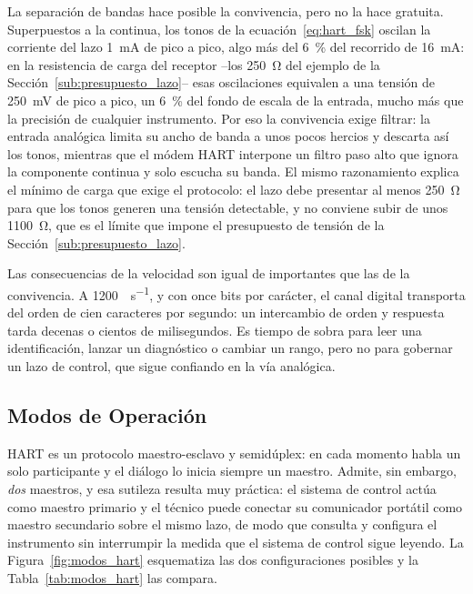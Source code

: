 La separación de bandas hace posible la convivencia, pero no la hace gratuita. Superpuestos a la continua, los tonos de la ecuación~\eqref{eq:hart_fsk} oscilan la corriente del lazo \SI{1}{\milli\ampere} de pico a pico, algo más del \SI{6}{\percent} del recorrido de \SI{16}{\milli\ampere}: en la resistencia de carga del receptor --los \SI{250}{\ohm} del ejemplo de la Sección~\ref{sub:presupuesto_lazo}-- esas oscilaciones equivalen a una tensión de \SI{250}{\milli\volt} de pico a pico, un \SI{6}{\percent} del fondo de escala de la entrada, mucho más que la precisión de cualquier instrumento. Por eso la convivencia exige filtrar: la entrada analógica limita su ancho de banda a unos pocos hercios y descarta así los tonos, mientras que el módem HART interpone un filtro paso alto que ignora la componente continua y solo escucha su banda. El mismo razonamiento explica el mínimo de carga que exige el protocolo: el lazo debe presentar al menos \SI{250}{\ohm} para que los tonos generen una tensión detectable, y no conviene subir de unos \SI{1100}{\ohm}, que es el límite que impone el presupuesto de tensión de la Sección~\ref{sub:presupuesto_lazo}.

Las consecuencias de la velocidad son igual de importantes que las de la convivencia. A \SI{1200}{\bit\per\second}, y con once bits por carácter, el canal digital transporta del orden de cien caracteres por segundo: un intercambio de orden y respuesta tarda decenas o cientos de milisegundos. Es tiempo de sobra para leer una identificación, lanzar un diagnóstico o cambiar un rango, pero no para gobernar un lazo de control, que sigue confiando en la vía analógica.

\subsection{Modos de Operación}\label{sub:modos_hart}

HART es un protocolo maestro-esclavo y semidúplex: en cada momento habla un solo participante y el diálogo lo inicia siempre un maestro. Admite, sin embargo, \emph{dos} maestros, y esa sutileza resulta muy práctica: el sistema de control actúa como maestro primario y el técnico puede conectar su comunicador portátil como maestro secundario sobre el mismo lazo, de modo que consulta y configura el instrumento sin interrumpir la medida que el sistema de control sigue leyendo. La Figura~\ref{fig:modos_hart} esquematiza las dos configuraciones posibles y la Tabla~\ref{tab:modos_hart} las compara.

